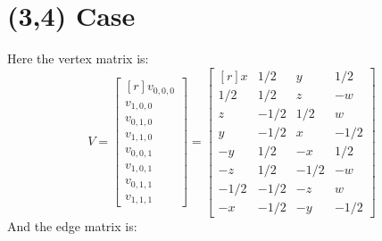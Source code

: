 \documentclass[12pt,titlepage]{article}
\begin{document}
\section{(3,4) Case}

Here the vertex matrix is:
\begin{equation*}
V =
\begin{bmatrix*}[r]
v_{0,0,0} \\
v_{1,0,0} \\
v_{0,1,0} \\
v_{1,1,0} \\
v_{0,0,1} \\
v_{1,0,1} \\
v_{0,1,1} \\
v_{1,1,1}
\end{bmatrix*}
=
\begin{bmatrix*}[r]
   x &  1/2 &    y &  1/2 \\
 1/2 &  1/2 &    z &   -w \\
   z & -1/2 &  1/2 &    w \\
   y & -1/2 &    x & -1/2 \\
  -y &  1/2 &   -x &  1/2 \\
  -z &  1/2 & -1/2 &   -w \\
-1/2 & -1/2 &   -z &    w \\
  -x & -1/2 &   -y & -1/2
\end{bmatrix*}
\end{equation*}
And the edge matrix is:
\end{document}
